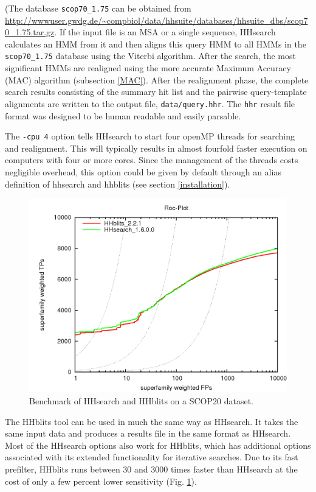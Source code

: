 \documentclass[11pt,a4paper]{article}
\begin{document}
(The database \verb`scop70_1.75` can be obtained from \url{http://wwwuser.gwdg.de/~compbiol/data/hhsuite/databases/hhsuite_dbs/scop70_1.75.tar.gz}. 
If the input file is an MSA or a single sequence, HHsearch calculates an HMM from it
and then aligns this query HMM to all HMMs in the \verb`scop70_1.75` database using the Viterbi 
algorithm. After the search, 
the most significant HMMs are realigned using the more accurate Maximum Accuracy (MAC) 
algorithm (subsection \ref{MAC}). After the realignment phase, the complete search results consisting of the 
summary hit list and the pairwise query-template alignments are written to the output file, \verb`data/query.hhr`.
The \verb`hhr` result file format was designed to be human readable and easily parsable.

The \verb`-cpu 4` option tells HHsearch to start four openMP threads for searching and realignment. This will typically results in almost fourfold faster execution on computers with four or more cores. Since the management of the threads costs negligible overhead, this option could be given by default through an alias definition of hhsearch and hhblits (see section \ref{installation}). 

\begin{figure}[h]
\begin{center}
\includegraphics[width=0.5 \textwidth]{hhblits-hhsearch.png}
\caption{Benchmark of HHsearch and HHblits on a SCOP20 dataset.}
\label{fig:hhsearch_hhblits_bench}
\end{center}
\end{figure}

The HHblits tool can be used in much the same way as HHsearch. 
It takes the same input data and produces a results file in the same format as HHsearch.
Most of the HHsearch options also work for HHblits, which has
additional options associated with its extended functionality for iterative searches. 
Due to its fast prefilter, HHblits runs between 30 and 3000 times faster than HHsearch
at the cost of only a few percent lower sensitivity (Fig. \ref{fig:hhsearch_hhblits_bench}).
\end{document}
